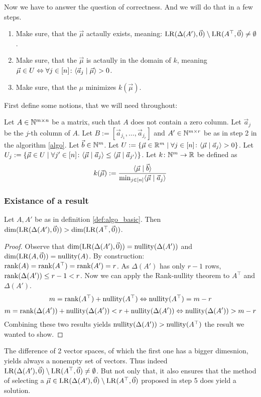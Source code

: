 Now we have to answer the question of correctness. And we will do that in a few steps.
\begin{enumerate}
    \item Make sure, that the $\vec\mu$ actaully exists, meaning: $\operatorname{LR}(\Delta(A'), \vec0) \setminus \operatorname{LR}(A^\top, \vec0) \neq \emptyset$.
    \item Make sure, that the $\vec\mu$ is actaully in the domain of $k$, meaning $\vec\mu \in U \Leftrightarrow \forall j \in [n]\colon \langle \vec a_j \mid \vec\mu \rangle>0$.
    \item Make sure, that the $\mu$ minimizes $k(\vec\mu)$.
\end{enumerate}
First define some notions, that we will need throughout:
\begin{definition}
    \label{def:algo_basic}
    Let $A \in \mathbb{N}^{m \times n}$ be a matrix, such that $A$ does not contain a zero column. Let $\vec a_j$ be the $j$-th column of $A$. Let $B := [\vec a_{j_1}, \dots, \vec a_{j_r}]$ and $A' \in \mathbb{N}^{m\times r}$ be as in step 2 in the algorithm \ref{algo}. Let $\vec b \in \mathbb{N}^m$. Let $U := \{\vec\mu \in \mathbb{R}^m\mid \forall j \in [n]\colon\langle \vec\mu \mid \vec a_j \rangle > 0\}$. Let $U_j := \{\vec\mu \in U \mid \forall j'\in[n]\colon \langle \vec\mu \mid \vec a_j \rangle \leq \langle \vec\mu \mid \vec a_{j'} \rangle\}$. Let $k\colon \mathbb{N}^m\to\mathbb{R}$ be defined as 
    $$k(\vec\mu) := \frac{\langle \vec\mu \mid \vec b \rangle}{\min_{j\in[n]}\langle \vec\mu \mid \vec a_j \rangle}$$
\end{definition}

\subsubsection{Existance of a result}
\begin{lemma}
    Let $A, A'$ be as in definition \ref{def:algo_basic}. Then $\dim(\operatorname{LR}(\Delta(A'), \vec0)) > \dim(\operatorname{LR}(A^\top, \vec0))$.
\end{lemma}
\begin{proof}
    Observe that $\dim(\operatorname{LR}(\Delta(A'), \vec0)) = \operatorname{nullity}(\Delta(A'))$ and $\dim(\operatorname{LR}(A, \vec0)) = \operatorname{nullity}(A)$. By construction: $\operatorname{rank}(A) = \operatorname{rank}(A^\top) = \operatorname{rank}(A') = r$. As $\Delta(A')$ has only $r-1$ rows, $\operatorname{rank}(\Delta(A')) \leq r-1 < r$. Now we can apply the Rank-nullity theorem to $A^\top$ and $\Delta(A')$.
    $$m = \operatorname{rank}(A^\top) + \operatorname{nullity}(A^\top) \Leftrightarrow \operatorname{nullity}(A^\top) = m - r$$
    $$m = \operatorname{rank}(\Delta(A')) + \operatorname{nullity}(\Delta(A')) < r + \operatorname{nullity}(\Delta(A'))\Leftrightarrow \operatorname{nullity}(\Delta(A')) > m - r$$
    Combining these two results yields $\operatorname{nullity}(\Delta(A')) > \operatorname{nullity}(A^\top)$ the result we wanted to show.
\end{proof}
The difference of 2 vector spaces, of which the first one has a bigger dimesnion, yields always a nonempty set of vectors. Thus indeed $\operatorname{LR}(\Delta(A'), \vec0) \setminus \operatorname{LR}(A^\top, \vec0) \neq \emptyset$. But not only that, it also ensures that the method of selecting a $\vec\mu \in \operatorname{LR}(\Delta(A'), \vec0) \setminus \operatorname{LR}(A^\top, \vec0)$ proposed in step 5 does yield a solution.

